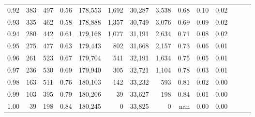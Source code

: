 \begin{tabular}{rrrrrrrrrrrrrr}
0.92 &    383 &  497 &  0.56 &  178,553 &    1,692 &  30,287 &   3,538 &  0.68 &  0.10 &      0.02 \\
0.93 &    335 &  462 &  0.58 &  178,888 &    1,357 &  30,749 &   3,076 &  0.69 &  0.09 &      0.02 \\
0.94 &    280 &  442 &  0.61 &  179,168 &    1,077 &  31,191 &   2,634 &  0.71 &  0.08 &      0.02 \\
0.95 &    275 &  477 &  0.63 &  179,443 &      802 &  31,668 &   2,157 &  0.73 &  0.06 &      0.01 \\
0.96 &    261 &  523 &  0.67 &  179,704 &      541 &  32,191 &   1,634 &  0.75 &  0.05 &      0.01 \\
0.97 &    236 &  530 &  0.69 &  179,940 &      305 &  32,721 &   1,104 &  0.78 &  0.03 &      0.01 \\
0.98 &    163 &  511 &  0.76 &  180,103 &      142 &  33,232 &     593 &  0.81 &  0.02 &      0.00 \\
0.99 &    103 &  395 &  0.79 &  180,206 &       39 &  33,627 &     198 &  0.84 &  0.01 &      0.00 \\
1.00 &     39 &  198 &  0.84 &  180,245 &        0 &  33,825 &       0 &   nan &  0.00 &      0.00 \\
\bottomrule
\end{tabular}
